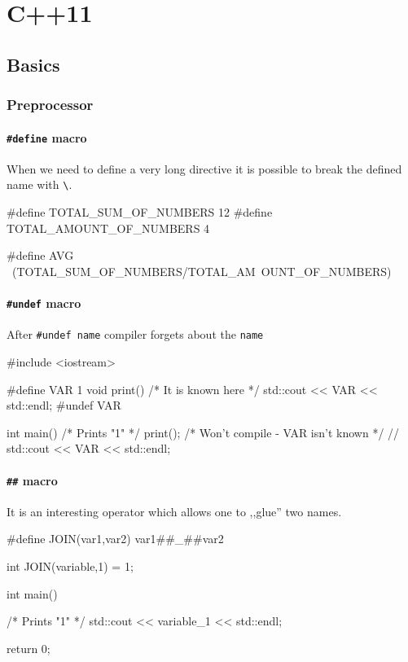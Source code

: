 \documentclass[../main]{subfiles}
\begin{document}
\chapter{C++11}
\section {Basics}
\subsection{Preprocessor}
\subsubsection{\texttt{\#define} macro}
    When we need to define a very long directive it is possible to break the defined name with \texttt{\textbackslash}.
\begin{Code}
    #define TOTAL_SUM_OF_NUMBERS 12
    #define TOTAL_AMOUNT_OF_NUMBERS 4
    
    #define AVG \
    (TOTAL_SUM_OF_NUMBERS/TOTAL_AM\
    OUNT_OF_NUMBERS)
\end{Code}

\subsubsection{\texttt{\#undef} macro}
    After \texttt{\#undef name} compiler forgets about the \texttt{name}
\begin{Code}
    #include <iostream>
    
    #define VAR 1
    void print()
    {
        /* It is known here */
        std::cout << VAR << std::endl;
    }
    #undef VAR
    
    int main()
    {
        /* Prints "1" */
        print();
        /* Won't compile - VAR isn't known */
        // std::cout << VAR << std::endl;
    }
\end{Code}

\subsubsection{\texttt{\#\#} macro}
    It is an interesting operator which allows one to ,,glue'' two names.
\begin{Code}
    #define JOIN(var1,var2) var1##_##var2
    
    int JOIN(variable,1) = 1;
    
    int main()
    {
        /* Prints "1" */
        std::cout << variable_1 << std::endl;
        
        return 0;
    }
\end{Code}
\end{document}

